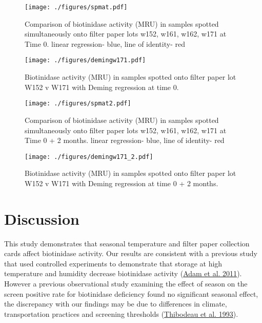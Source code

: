 \documentclass[review]{elsarticle}
\begin{document}
\begin{figure}[htbp]
\centering
\texttt{[image: ./figures/spmat.pdf]}
\caption{\label{fig:orga445bfe}Comparison of biotinidase activity (MRU) in samples spotted simultaneously onto filter paper lots w152, w161, w162, w171 at Time 0. linear regression- blue, line of identity- red}
\end{figure}

\begin{figure}[htbp]
\centering
\texttt{[image: ./figures/demingw171.pdf]}
\caption{\label{fig:orgdf7972b}Biotinidase activity (MRU) in samples spotted onto filter paper lot W152 v W171 with Deming regression at time 0.}
\end{figure}
\clearpage

\begin{figure}[htbp]
\centering
\texttt{[image: ./figures/spmat2.pdf]}
\caption{\label{fig:orgbda57e6}Comparison of biotinidase activity (MRU) in samples spotted simultaneously onto filter paper lots w152, w161, w162, w171 at Time 0 + 2 months. linear regression- blue, line of identity- red}
\end{figure}

\begin{figure}[htbp]
\centering
\texttt{[image: ./figures/demingw171\_2.pdf]}
\caption{\label{fig:org0537868}Biotinidase activity (MRU) in samples spotted onto filter paper lot W152 v W171 with Deming regression at time 0 + 2 months.}
\end{figure}

\clearpage

\section*{Discussion}
\label{sec:org7e0c06a}
This study demonstrates that seasonal temperature and filter paper
collection cards affect biotinidase activity. Our results are
consistent with a previous study that used controlled experiments to
demonstrate that storage at high temperature and humidity decrease
biotinidase activity (\hyperlink{citeproc_bib_item_1}{Adam et al. 2011}). However a previous
observational study examining the effect of season on the screen
positive rate for biotinidase deficiency found no significant seasonal
effect, the discrepancy with our findings may be due to differences in
climate, transportation practices and screening thresholds (\hyperlink{citeproc_bib_item_12}{Thibodeau et al. 1993}).
\end{document}
